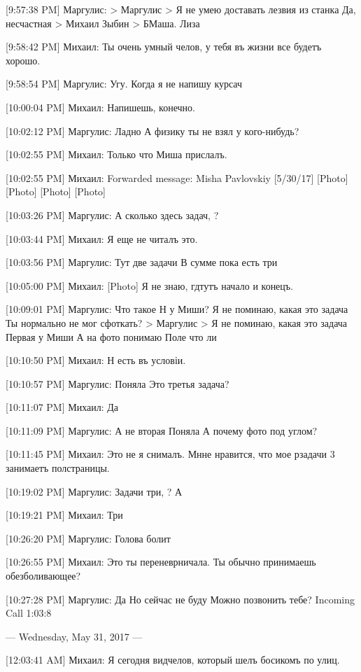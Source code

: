 \documentclass{article}
\newcommand{\yat}{{\fontencoding{X2}\selectfont\cyryat}} %
\begin{document}
{[9:57:38 PM] Маргулис:
> Маргулис
> Я не умею доставать лезвия из станка
Да, несчастная
> Михаил Зыбин
> Б Маша.
Лиза

[9:58:42 PM] Михаил:
Ты очень умный челов, у тебя въ жизни все будетъ хорошо.

[9:58:54 PM] Маргулис:
Угу.
 Когда я не напишу курсач

[10:00:04 PM] Михаил:
Напишешь, конечно.

[10:02:12 PM] Маргулис:
Ладно
 А физику ты не взял у кого-нибудь?

[10:02:55 PM] Михаил:
Только что Миша прислалъ.

[10:02:55 PM] Михаил:
Forwarded message: Misha Pavlovskiy [5/30/17] 
[Photo]
[Photo]
[Photo]
[Photo]

[10:03:26 PM] Маргулис:
А сколько здесь задач,
 ?

[10:03:44 PM] Михаил:
Я еще не читалъ это.

[10:03:56 PM] Маргулис:
Тут две задачи
 В сумме пока есть три

[10:05:00 PM] Михаил:
[Photo]
 Я не знаю, гд\yat тутъ начало и конецъ.

[10:09:01 PM] Маргулис:
Что такое Н у Миши?
 Я не поминаю, какая это задача
 Ты нормально не мог сфоткать?
> Маргулис
> Я не поминаю, какая это задача
Первая у Миши
 А на фото понимаю
 Поле что ли

[10:10:50 PM] Михаил:
Н есть въ условіи.

[10:10:57 PM] Маргулис:
Поняла
 Это третья задача?

[10:11:07 PM] Михаил:
Да

[10:11:09 PM] Маргулис:
А не вторая
 Поняла
 А почему фото под углом?

[10:11:45 PM] Михаил:
Это не я снималъ.
 Мн\yat не нравится, что мое р задачи 3 занимаетъ полстраницы.

[10:19:02 PM] Маргулис:
Задачи три,
 ?
 А

[10:19:21 PM] Михаил:
Три

[10:26:20 PM] Маргулис:
Голова болит

[10:26:55 PM] Михаил:
Это ты переневрничала.
 Ты обычно принимаешь обезболивающее?

[10:27:28 PM] Маргулис:
Да
 Но сейчас не буду
 Можно позвонить тебе?
Incoming Call 1:03:8

--- Wednesday, May 31, 2017 ---

[12:03:41 AM] Михаил:
Я сегодня вид челов, который шелъ босикомъ по улиц\yat.

}
\end{document}
